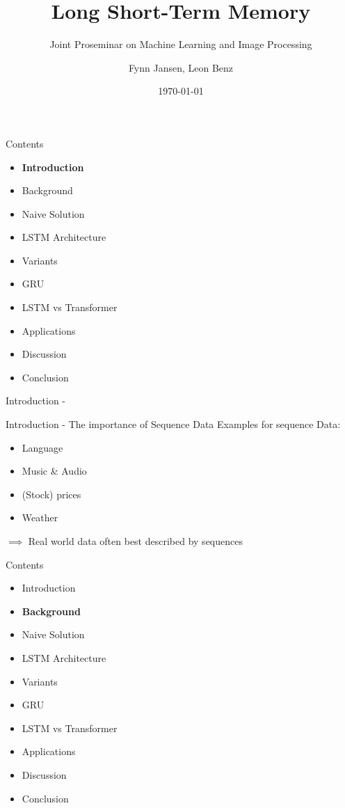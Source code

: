 \documentclass[10pt, aspectratio=169]{beamer}
\title{Long Short-Term Memory}
\subtitle{Joint Proseminar on Machine Learning and Image Processing}
\date{\today}
\author{Fynn Jansen, Leon Benz}
\institute{Chair of Computer Science 13 (Computer Vision)\\RWTH Aachen}
\begin{document}
\maketitle


\begin{frame}[t]{Contents}
\begin{itemize}
    \item \textbf{Introduction}
    \item Background
    \item Naive Solution
    \item LSTM Architecture
    \item Variants
    \item GRU
    \item LSTM vs Transformer
    \item Applications
    \item Discussion
    \item Conclusion
\end{itemize}
\end{frame}

\begin{frame}{Introduction - }
    
\end{frame}

\begin{frame}[t]{Introduction - The importance of Sequence Data}
Examples for sequence Data: \pause
\begin{itemize}
    \item Language \pause
    \item Music \& Audio \pause
    \item (Stock) prices \pause
    \item Weather \pause
\end{itemize}
\begin{math}\implies\end{math} Real world data often best described by sequences
\end{frame}

\begin{frame}[t]{Contents}
\begin{itemize}
    \item Introduction
    \item \textbf{Background}
    \item Naive Solution
    \item LSTM Architecture
    \item Variants
    \item GRU
    \item LSTM vs Transformer
    \item Applications
    \item Discussion
    \item Conclusion
\end{itemize}
\end{frame}
\end{document}
